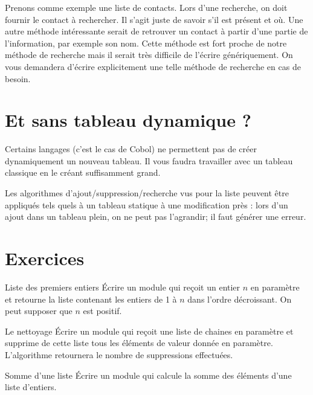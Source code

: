 \bigskip



Prenons comme exemple une liste de contacts.
Lors d'une recherche, on doit fournir
 le contact à
rechercher. Il s'agit juste de savoir
s'il est présent et où. Une autre méthode intéressante
serait de retrouver un contact à partir d'une partie
de l'information, par exemple son nom. Cette méthode
est fort proche de notre méthode de recherche mais il serait très
difficile de l'écrire génériquement. On vous demandera
d'écrire explicitement une telle méthode de recherche
en cas de besoin.


\section{Et sans tableau dynamique ?}

Certains langages (c’est le cas de Cobol) ne permettent pas de créer
dynamiquement un nouveau tableau. Il vous faudra travailler avec un
tableau classique en le créant suffisamment grand.


Les algorithmes d’ajout/suppression/recherche vus pour la liste peuvent
être appliqués tels quels à un tableau statique à une modification près
: lors d’un ajout dans un tableau plein, on ne peut pas l’agrandir; il
faut générer une erreur.


\section{Exercices}

\begin{Exercice}{Liste des premiers entiers}
	Écrire un module qui reçoit un entier $n$ en paramètre et retourne la
	liste contenant les entiers de 1 à $n$ dans l'ordre
	décroissant. On peut supposer que $n$ est positif.
\end{Exercice}
	
\begin{Exercice}{Le nettoyage}
	Écrire un module qui reçoit une liste de chaines en paramètre et
	supprime de cette liste tous les éléments de valeur donnée en
	paramètre. L'algorithme retournera le nombre de
	suppressions effectuées.
\end{Exercice}
	
\begin{Exercice}{Somme d'une liste}
	Écrire un module qui calcule la somme des éléments d’une liste
	d’entiers.
\end{Exercice}

